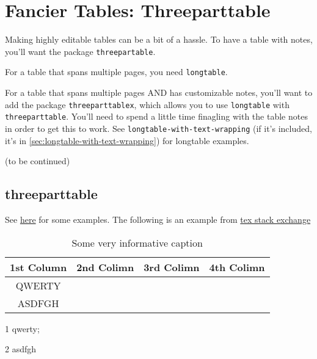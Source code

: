 \section{Fancier Tables: Threeparttable}\label{sec:threeparttable}


Making highly editable tables can be a bit of a hassle. To have a table with notes, you'll want the package \verb+threepartable+. 

For a table that spans multiple pages, you need \verb+longtable+. 

For a table that spans multiple pages AND has customizable notes, you'll want to add the package \verb+threeparttablex+, which allows you to use \verb+longtable+ with \verb+threeparttable+. You'll need to spend a little time finagling with the table notes in order to get this to work. See \verb+longtable-with-text-wrapping+ (if it's included, it's in \ref{sec:longtable-with-text-wrapping}) for longtable examples.

(to be continued)
\subsection{threeparttable}
See \href{https://tug.org/pracjourn/2007-2/asknelly/}{here} for some examples.
The following is an example from \href{https://tex.stackexchange.com/questions/118743/threeparttable-notes-layout}{tex stack exchange}


\begin{table}[htp]
\caption{Some very informative caption}
\begin{center}
\begin{threeparttable}
\begin{tabular}{c c c c}
    \toprule
    \textbf{1st Column} & \textbf{2nd Colimn} & \textbf{3rd Colimn} & \textbf{4th Colimn} \\ \midrule
      QWERTY\tnote{1}   &                     &                     &  \\
      ASDFGH\tnote{2}   &                     &                     &  \\ \bottomrule
\end{tabular}
\begin{tablenotes}
\item[1] qwerty; \item[2] asdfgh
\end{tablenotes}
\end{threeparttable}
\end{center}
\label{table:simDisimCoefNewDef}
\end{table}



